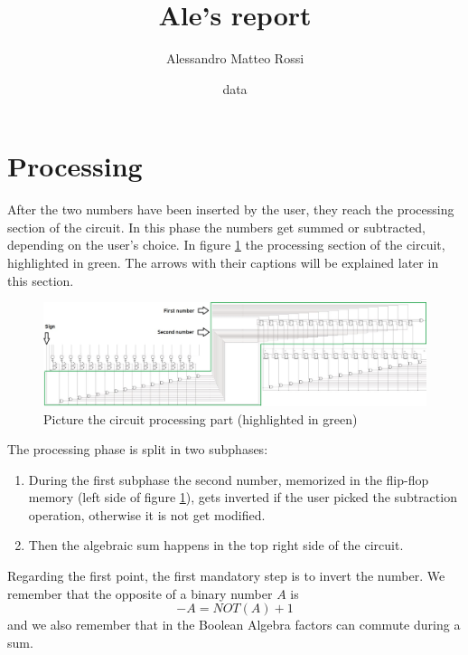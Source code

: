 \documentclass{article}
\title{Ale's report}
\author{Alessandro Matteo Rossi}
\date{data}
\begin{document}
\maketitle




\tableofcontents

\clearpage
\section{Processing}

After the two numbers have been inserted by the user, they reach the processing section of the circuit. In this phase the numbers get summed or subtracted, depending on the user's choice. In figure \ref{Processing_Total} the processing section of the circuit, highlighted in green. The arrows with their captions will be explained later in this section.

\begin{figure}[h]
  \centering
  \includegraphics[scale=0.43]{SC_Processing_Total.JPG}
  \caption{Picture the circuit processing part (highlighted in green)}
  \label{Processing_Total}
\end{figure}

The processing phase is split in two subphases:
\begin{enumerate}
  \item During the first subphase the second number, memorized in the flip-flop memory (left side of figure \ref{Processing_Total}), gets inverted if the user picked the subtraction operation, otherwise it is not get modified.
  \item Then the algebraic sum happens in the top right side of the circuit.
\end{enumerate}

Regarding the first point, the first mandatory step is to invert the number. We remember that the opposite of a binary number $A$ is
\begin{equation}
-A=NOT(A)+1
\label{Law}
\end{equation}
and we also remember that in the Boolean Algebra factors can commute during a sum.
\end{document}
